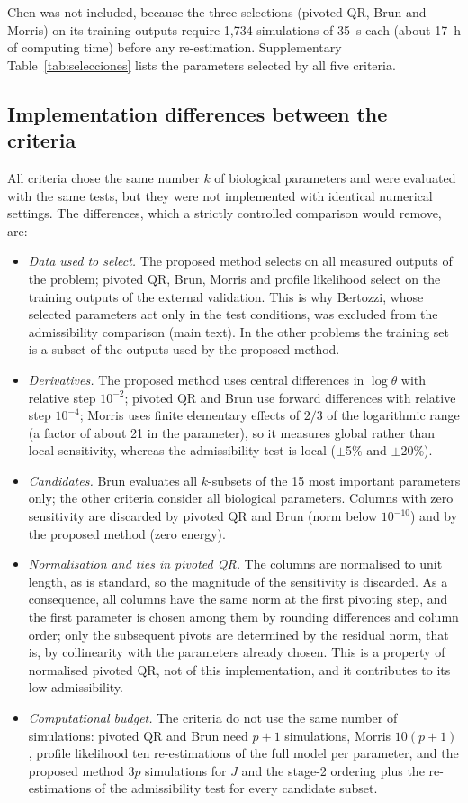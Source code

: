 Chen was not included, because the three selections (pivoted QR, Brun and Morris) on its training outputs require 1,734 simulations of 35~s each (about 17~h of computing time) before any re-estimation. Supplementary Table~\ref{tab:selecciones} lists the parameters selected by all five criteria.

\subsection*{Implementation differences between the criteria}
All criteria chose the same number $k$ of biological parameters and were evaluated with the same tests, but they were not implemented with identical numerical settings. The differences, which a strictly controlled comparison would remove, are:
\begin{itemize}\itemsep0pt
\item \emph{Data used to select.} The proposed method selects on all measured outputs of the problem; pivoted QR, Brun, Morris and profile likelihood select on the training outputs of the external validation. This is why Bertozzi, whose selected parameters act only in the test conditions, was excluded from the admissibility comparison (main text). In the other problems the training set is a subset of the outputs used by the proposed method.
\item \emph{Derivatives.} The proposed method uses central differences in $\log\theta$ with relative step $10^{-2}$; pivoted QR and Brun use forward differences with relative step $10^{-4}$; Morris uses finite elementary effects of $2/3$ of the logarithmic range (a factor of about 21 in the parameter), so it measures global rather than local sensitivity, whereas the admissibility test is local ($\pm$5\% and $\pm$20\%).
\item \emph{Candidates.} Brun evaluates all $k$-subsets of the 15 most important parameters only; the other criteria consider all biological parameters. Columns with zero sensitivity are discarded by pivoted QR and Brun (norm below $10^{-10}$) and by the proposed method (zero energy).
\item \emph{Normalisation and ties in pivoted QR.} The columns are normalised to unit length, as is standard, so the magnitude of the sensitivity is discarded. As a consequence, all columns have the same norm at the first pivoting step, and the first parameter is chosen among them by rounding differences and column order; only the subsequent pivots are determined by the residual norm, that is, by collinearity with the parameters already chosen. This is a property of normalised pivoted QR, not of this implementation, and it contributes to its low admissibility.
\item \emph{Computational budget.} The criteria do not use the same number of simulations: pivoted QR and Brun need $p+1$ simulations, Morris $10(p+1)$, profile likelihood ten re-estimations of the full model per parameter, and the proposed method $3p$ simulations for $J$ and the stage-2 ordering plus the re-estimations of the admissibility test for every candidate subset.
\end{itemize}
